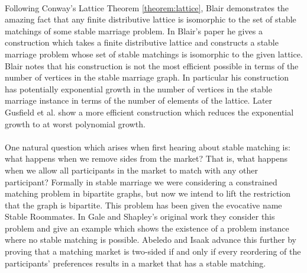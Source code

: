 \paragraph{}
Following Conway's Lattice Theorem \ref{theorem:lattice}, Blair  \cite{blair1984every} demonstrates the amazing fact that any finite distributive lattice is isomorphic to the set of stable matchings of some stable marriage problem. In Blair's paper he gives a construction which takes a finite distributive lattice and constructs a stable marriage problem whose set of stable matchings is isomorphic to the given lattice. Blair notes that his construction is not the most efficient possible in terms of the number of vertices in the stable marriage graph. In particular his construction has potentially exponential growth in the number of vertices in the stable marriage instance in terms of the number of elements of the lattice. Later Gusfield et al. \cite{gusfield1987every} show a more efficient construction which reduces the exponential growth to at worst polynomial growth.

\paragraph{}
One natural question which arises when first hearing about stable matching is: what happens when we remove sides from the market? That is, what happens when we allow all participants in the market to match with any other participant? Formally in stable marriage we were considering a constrained matching problem in bipartite graphs, but now we intend to lift the restriction that the graph is bipartite. This problem has been given the evocative name Stable Roommates. In Gale and Shapley's original work \cite{gale1962college} they consider this problem and give an example which shows the existence of a problem instance where no stable matching is possible.  Abeledo and Isaak \cite{abeledo1991characterization} advance this further by proving that a matching market is two-sided if and only if every reordering of the participants' preferences results in a market that has a stable matching.
